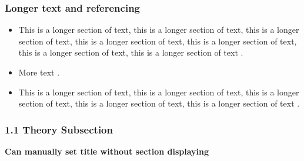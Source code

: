 \documentclass[t,compress,9pt,aspectratio=169]{beamer}
\begin{document}
\begin{frame}[fragile]
  \frametitle{Longer text and referencing}
    \begin{itemize}
      \item{This is a longer section of text, this is a longer section of text, this is a longer section of text, this is a longer   section of text, this is a longer section of text, this is a longer section of text, this is a longer section of text   \citep{Smets2013, Franklin2002, IDEAturnout, Lijphart1997}.}
      \item{More text \citep{Brady1995a, Downs1957, Geys2006}.}
      \item{This is a longer section of text, this is a longer section of text, this is a longer section of text, this is a longer section of text, this is a longer section of text \citep{Easton1965, Easton1975}.}
    \end{itemize}
\end{frame}



\subsubsection{1.1 Theory Subsection}
\begin{frame}[fragile]
\noframetitle

\textcolor{nclblue}{\textbf{Can manually set title without section displaying}}\\[-1.2ex] 
\noindent\makebox[\linewidth]{\color{nclred}\rule{0.9\paperwidth}{0.4pt}}

\end{frame}




\end{document}
